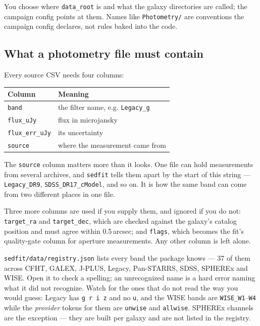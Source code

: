 \documentclass[11pt]{article}
\begin{document}
You choose where \texttt{data\_root} is and what the galaxy directories
are called; the campaign config points at them. Names like
\texttt{Photometry/} are conventions the campaign config declares, not
rules baked into the code.

\subsection{What a photometry file must contain}

Every source CSV needs four columns:

\begin{center}
\begin{tabular}{ll}
\toprule
\textbf{Column} & \textbf{Meaning} \\
\midrule
\texttt{band} & the filter name, e.g. \texttt{Legacy\_g} \\
\texttt{flux\_uJy} & flux in microjansky \\
\texttt{flux\_err\_uJy} & its uncertainty \\
\texttt{source} & where the measurement came from \\
\bottomrule
\end{tabular}
\end{center}

The \texttt{source} column matters more than it looks. One file can hold
measurements from several archives, and \texttt{sedfit} tells them apart
by the start of this string --- \texttt{Legacy\_DR9},
\texttt{SDSS\_DR17\_cModel}, and so on. It is how the same band can come
from two different places in one file.

Three more columns are used if you supply them, and ignored if you do
not: \texttt{target\_ra} and \texttt{target\_dec}, which are checked
against the galaxy's catalog position and must agree within
0.5\,arcsec; and \texttt{flags}, which becomes the fit's quality-gate
column for aperture measurements. Any other column is left alone.

\begin{notebox}
\texttt{sedfit/data/registry.json} lists every band the package knows
--- 37 of them across CFHT, GALEX, J-PLUS, Legacy, Pan-STARRS, SDSS,
SPHEREx and WISE. Open it to check a spelling; an unrecognized name is
a hard error naming what it did not recognize. Watch for the ones that
do not read the way you would guess: Legacy has \texttt{g r i z} and no
\texttt{u}, and the WISE bands are \texttt{WISE\_W1}--\texttt{W4} while
the \emph{provider} tokens for them are \texttt{unwise} and
\texttt{allwise}. SPHEREx channels are the exception --- they are built
per galaxy and are not listed in the registry.
\end{notebox}
\end{document}
